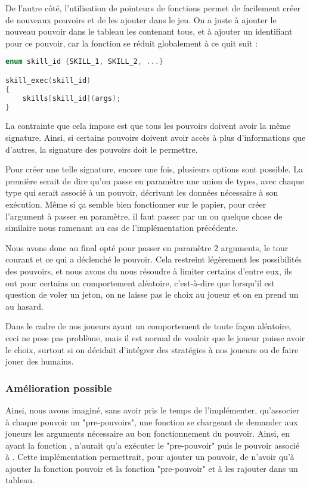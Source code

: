 De l'autre côté, l'utilisation de pointeurs de fonctions permet de facilement créer de nouveaux pouvoirs et de les ajouter dans le jeu. On a juste à ajouter le nouveau pouvoir dans le tableau les contenant tous, et à ajouter un identifiant pour ce pouvoir, car la fonction  se réduit globalement à ce quit suit :


\begin{lstlisting}[language=c, frame=single, caption={Pseudocode de la version de skill\_exec avec des pointeurs de fonction}]
enum skill_id {SKILL_1, SKILL_2, ...}

skill_exec(skill_id)
{
    skills[skill_id](args);
}
\end{lstlisting}


La contrainte que cela impose est que tous les pouvoirs doivent avoir la même signature. Ainsi, si certains pouvoirs doivent avoir accès à plus d'informations que d'autres, la signature des pouvoirs doit le permettre.

Pour créer une telle signature, encore une fois, plusieurs options sont possible. La première serait de dire qu'on passe en paramètre une union de types, avec chaque type qui serait associé à un pouvoir, décrivant les données nécessaire à son exécution. Même si ça semble bien fonctionner sur le papier, pour créer l'argument à passer en paramètre, il faut passer par un  ou quelque chose de similaire nous ramenant au cas de l'implémentation précédente.

Nous avons donc au final opté pour passer en paramètre 2 arguments, le tour courant et ce qui a déclenché le pouvoir. Cela restreint légèrement les possibilités des pouvoirs, et nous avons du nous résoudre à limiter certains d'entre eux, ils ont pour certains un comportement aléatoire, c'est-à-dire que lorsqu'il est question de voler un jeton, on ne laisse pas le choix au joueur et on en prend un au hasard.

Dans le cadre de nos joueurs ayant un comportement de toute façon aléatoire, ceci ne pose pas problème, mais il est normal de vouloir que le joueur puisse avoir le choix, surtout si on décidait d'intégrer des stratégies à nos joueurs ou de faire jouer des humains.

\subsubsection*{Amélioration possible}

Ainsi, nous avons imaginé, sans avoir pris le temps de l'implémenter, qu'associer à chaque pouvoir un "pre-pouvoirs", une fonction se chargeant de demander aux joueurs les arguments nécessaire au bon fonctionnement du pouvoir. Ainsi, en ayant la fonction , n'aurait qu'a exécuter le "pre-pouvoir" puis le pouvoir associé à . Cette implémentation permettrait, pour ajouter un pouvoir, de n'avoir qu'à ajouter la fonction pouvoir et la fonction "pre-pouvoir" et à les rajouter dans un tableau.


